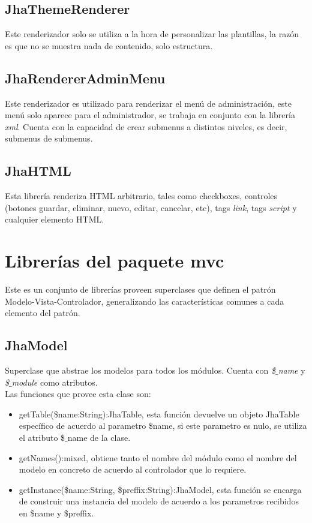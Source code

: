 \subsection{JhaThemeRenderer}
Este renderizador solo se utiliza a la hora de personalizar las plantillas, la raz\'on es que no se muestra nada de contenido, solo estructura.

\subsection{JhaRendererAdminMenu}
Este renderizador es utilizado para renderizar el men\'u de administraci\'on, este men\'u solo aparece para el administrador, se trabaja en conjunto con la librer\'ia \textit{xml}. Cuenta con la capacidad de crear submenus a distintos niveles, es decir, submenus de submenus.

\subsection{JhaHTML}
Esta librer\'ia renderiza HTML arbitrario, tales como checkboxes, controles (botones guardar, eliminar, nuevo, editar, cancelar, etc), tags \textit{link}, tags \textit{script} y cualquier elemento HTML.

\section{Librer\'ias del paquete \textsf{mvc}}
Este es un conjunto de librer\'ias proveen superclases que definen el patr\'on Modelo-Vista-Controlador, generalizando las caracter\'isticas comunes a cada elemento del patr\'on.

\subsection{JhaModel}
Superclase que abstrae los modelos para todos los m\'odulos. Cuenta con \textit{\$$\_$name} y \textit{\$$\_$module} como atributos.\\
Las funciones que provee esta clase son:
\begin{itemize}
\item \textsf{getTable(\$name:String):JhaTable}, esta funci\'on devuelve un objeto JhaTable espec\'ifico de acuerdo al parametro \$name, si este parametro es nulo, se utiliza el atributo \$$\_$name de la clase.
\item \textsf{getNames():mixed}, obtiene tanto el nombre del m\'odulo como el nombre del modelo en concreto de acuerdo al controlador que lo requiere.
\item \textsf{getInstance(\$name:String, \$preffix:String):JhaModel}, esta funci\'on se encarga de construir una instancia del modelo de acuerdo a los parametros recibidos en \$name y \$preffix.
\end{itemize}

